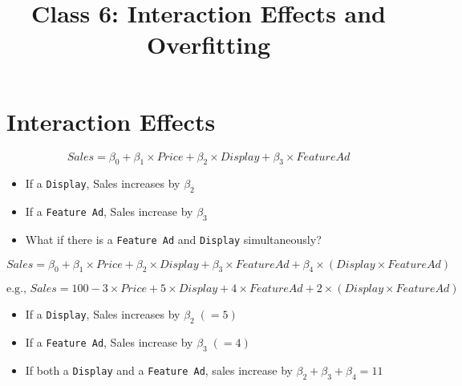 \documentclass[10pt,article]{article}
\date{\vspace{-6ex}}
\title{Class 6: Interaction Effects and Overfitting}
\begin{document}
\maketitle
{} 
\thispagestyle{fancy}

\setcounter{tocdepth}{1}
\tableofcontents
\vspace{6ex}

\section{Interaction Effects}
\label{sec:org32795b4}
\[  Sales = \beta_0 + \beta_1 \times Price + \beta_2 \times Display + \beta_3
      \times Feature Ad \]
\begin{itemize}
\item If a \texttt{Display}, Sales increases by \(\beta_2\)
\item If a \texttt{Feature Ad}, Sales increase by \(\beta_3\)
\item What if there is a \texttt{Feature Ad} and \texttt{Display} simultaneously?
\end{itemize}

\iffalse
\begin{align*}
 Sales = & \beta_0 + \beta_1 \times Price + \beta_2 \times Display + \beta_3 \times Feature Ad \\
         & + \beta_4 \times (Display \times Feature Ad)
\end{align*}



\begin{align*}
 Sales = & 100 - 3 \times Price + 5 \times Display + 4 \times Feature Ad \\
         & + 2 \times (Display \times Feature Ad)
\end{align*}
\fi



\[ Sales = \beta_0 + \beta_1 \times Price + \beta_2 \times Display + \beta_3
\times Feature Ad + \beta_4 \times (Display \times Feature Ad) \]

\[ \text{e.g., } Sales = 100 - 3 \times Price + 5 \times Display + 4 \times Feature Ad + 2
\times (Display \times Feature Ad) \]

\begin{itemize}
\item If a \texttt{Display}, Sales increases by \(\beta_2  \; (=5)\)
\item If a \texttt{Feature Ad}, Sales increase by \(\beta_3  \; (=4)\)
\item If both a \texttt{Display} and a \texttt{Feature Ad}, sales increase by \(\beta_2 +
  \beta_3 + \beta_4 = 11\)
\end{itemize}
\end{document}
